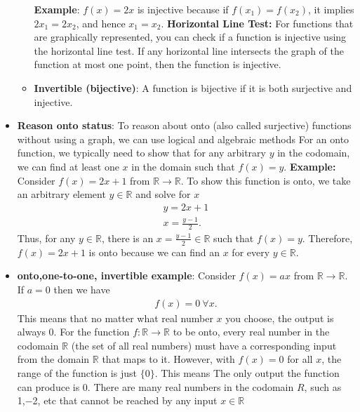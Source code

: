 \documentclass{report}
\begin{document}
\begin{itemize}
\begin{itemize}
                            \bigbreak \noindent 
                            \textbf{Example}: \( f(x) = 2x \) is injective because if \( f(x_1) = f(x_2) \), it implies \( 2x_1 = 2x_2 \), and hence \( x_1 = x_2 \).
                            \bigbreak \noindent 
                            \textbf{Horizontal Line Test:} For functions that are graphically represented, you can check if a function is injective using the horizontal line test. If any horizontal line intersects the graph of the function at most one point, then the function is injective.
                        \item \textbf{Invertible (bijective)}: A function is bijective if it is both surjective and injective.
                    \end{itemize}
            \item \textbf{Reason onto status}:  To reason about onto (also called surjective) functions without using a graph, we can use logical and algebraic methods
                \bigbreak \noindent 
                For an onto function, we typically need to show that for any arbitrary $y$ in the codomain, we can find at least one $x$ in the domain such that $f(x)=y.$
                \bigbreak \noindent 
                \textbf{Example:} Consider $f(x) = 2x+ 1 $ from $\mathbb{R} \to \mathbb{R}$. To show this function is onto, we take an arbitrary element $y\in\mathbb{R}$ and solve for $x$
                \begin{align*}
                    y = 2x+ 1 \\
                    x = \frac{y-1}{2}
                .\end{align*}
                \bigbreak \noindent 
                Thus, for any \( y \in \mathbb{R} \), there is an \( x = \frac{y - 1}{2} \in \mathbb{R} \) such that \( f(x) = y \). Therefore, \( f(x) = 2x + 1 \) is onto because we can find an \( x \) for every \( y \in \mathbb{R} \).
            \item \textbf{onto,one-to-one, invertible example}: Consider $f(x) = ax $ from $\mathbb{R} \to \mathbb{R}$. 
                \bigbreak \noindent 
                If $a=0$ then we have
                \begin{align*}
                    f(x) = 0\ \forall x
                .\end{align*}
                \bigbreak \noindent 
                This means that no matter what real number $x $ you choose, the output is always 0.
                \bigbreak \noindent 
                For the function $f: \mathbb{R}\to \mathbb{R}$ to be onto, every real number in the codomain $\mathbb{R}$ (the set of all real numbers) must have a corresponding input from the domain $\mathbb{R}$ that maps to it. However, with $f(x)=0$ for all $x$, the range of the function is just  $\{0\}$. This means The only output the function can produce is 0. There are many real numbers in the codomain $R$, such as 1,−2, etc that cannot be reached by any input  $x\in \mathbb{R}$

\end{itemize}
\end{document}
